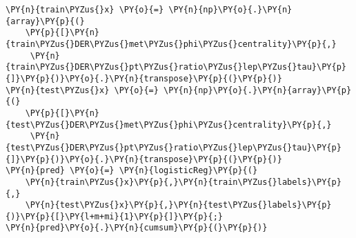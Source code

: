 
{\par%
\vspace{-1\baselineskip}%
}%
\begin{notebookcell}[]%
\begin{addmargin}[\cellleftmargin]{0em}%
{\smaller%
\par%
%
\vspace{-1\smallerfontscale}%
\begin{Verbatim}[commandchars=\\\{\}]
\PY{n}{train\PYZus{}x} \PY{o}{=} \PY{n}{np}\PY{o}{.}\PY{n}{array}\PY{p}{(}
    \PY{p}{[}\PY{n}{train\PYZus{}DER\PYZus{}met\PYZus{}phi\PYZus{}centrality}\PY{p}{,}
     \PY{n}{train\PYZus{}DER\PYZus{}pt\PYZus{}ratio\PYZus{}lep\PYZus{}tau}\PY{p}{]}\PY{p}{)}\PY{o}{.}\PY{n}{transpose}\PY{p}{(}\PY{p}{)}
\PY{n}{test\PYZus{}x} \PY{o}{=} \PY{n}{np}\PY{o}{.}\PY{n}{array}\PY{p}{(}
    \PY{p}{[}\PY{n}{test\PYZus{}DER\PYZus{}met\PYZus{}phi\PYZus{}centrality}\PY{p}{,}
     \PY{n}{test\PYZus{}DER\PYZus{}pt\PYZus{}ratio\PYZus{}lep\PYZus{}tau}\PY{p}{]}\PY{p}{)}\PY{o}{.}\PY{n}{transpose}\PY{p}{(}\PY{p}{)}
\PY{n}{pred} \PY{o}{=} \PY{n}{logisticReg}\PY{p}{(}
    \PY{n}{train\PYZus{}x}\PY{p}{,}\PY{n}{train\PYZus{}labels}\PY{p}{,}
    \PY{n}{test\PYZus{}x}\PY{p}{,}\PY{n}{test\PYZus{}labels}\PY{p}{)}\PY{p}{[}\PY{l+m+mi}{1}\PY{p}{]}\PY{p}{;}
\PY{n}{pred}\PY{o}{.}\PY{n}{cumsum}\PY{p}{(}\PY{p}{)}
\end{Verbatim}
%
\par%
\vspace{-1\smallerfontscale}}%
\end{addmargin}
\end{notebookcell}



